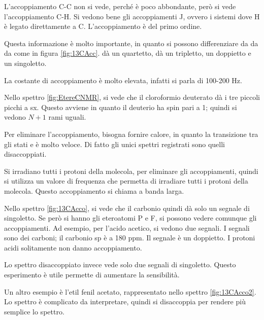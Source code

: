 L'accoppiamento C-C non si vede, perché è poco abbondante, però si
vede l'accoppiamento C-H. Si vedono bene gli accoppiamenti J, ovvero
i sistemi dove H è legato direttamente a C. L'accoppiamento è del
primo ordine.

Questa informazione è molto importante, in quanto si possono differenziare  da  da  da  come in figura \ref{fig:13CAcc}.  dà un quartetto,  dà un tripletto,  un doppietto e  un singoletto.


La costante di accoppiamento è molto elevata, infatti  si parla di 100-200 Hz.


Nello spettro \ref{fig:EtereCNMR}, si vede che il cloroformio deuterato dà i tre piccoli picchi a sx. Questo avviene in quanto il deuterio ha spin pari a 1; quindi si vedono \(N+1\) rami uguali.

Per eliminare l'accoppiamento, bisogna fornire calore, in quanto la transizione tra gli stati \alpha{} e \beta{} è molto veloce.
Di fatto gli unici spettri registrati sono quelli disaccoppiati.


Si irradiano tutti i protoni della molecola, per eliminare gli
accoppiamenti, quindi si utilizza un valore di frequenza che permetta di
irradiare tutti i protoni della molecola. Questo accoppiamento si chiama
a banda larga.


Nello spettro \ref{fig:13CAcco}, si vede che il carbonio quindi dà solo un segnale di singoletto. Se però si hanno
gli eteroatomi P e F, si possono vedere comunque gli accoppiamenti.
Ad esempio, per l'acido acetico, si vedono due segnali. I segnali sono
dei carboni; il carbonio sp è a 180 ppm. Il segnale è un doppietto.
I protoni acidi solitamente non danno accoppiamento.

Lo spettro disaccoppiato invece vede solo due segnali di singoletto.
Questo esperimento è utile permette di aumentare la sensibilità.


Un altro esempio è l'etil fenil acetato, rappresentato nello spettro \ref{fig:13CAcco2}. Lo spettro è complicato da
interpretare, quindi si disaccoppia per rendere più semplice lo spettro.


